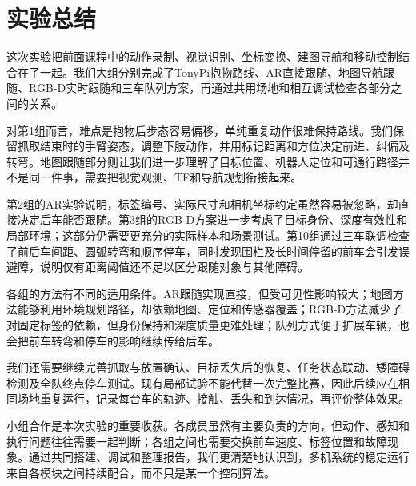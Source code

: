 \section{实验总结}
这次实验把前面课程中的动作录制、视觉识别、坐标变换、建图导航和移动控制结合在了一起。我们大组分别完成了TonyPi抱物路线、AR直接跟随、地图导航跟随、RGB-D实时跟随和三车队列方案，再通过共用场地和相互调试检查各部分之间的关系。

对第1组而言，难点是抱物后步态容易偏移，单纯重复动作很难保持路线。我们保留抓取结束时的手臂姿态，调整下肢动作，并用标记距离和方位决定前进、纠偏及转弯。地图跟随部分则让我们进一步理解了目标位置、机器人定位和可通行路径并不是同一件事，需要把视觉观测、TF和导航规划衔接起来。

第2组的AR实验说明，标签编号、实际尺寸和相机坐标约定虽然容易被忽略，却直接决定后车能否跟随。第3组的RGB-D方案进一步考虑了目标身份、深度有效性和局部环境；这部分仍需要更充分的实际样本和场景测试。第10组通过三车联调检查了前后车间距、圆弧转弯和顺序停车，同时发现围栏及长时间停留的前车会引发误避障，说明仅有距离阈值还不足以区分跟随对象与其他障碍。

各组的方法有不同的适用条件。AR跟随实现直接，但受可见性影响较大；地图方法能够利用环境规划路径，却依赖地图、定位和传感器覆盖；RGB-D方法减少了对固定标签的依赖，但身份保持和深度质量更难处理；队列方式便于扩展车辆，也会把前车转弯和停车的影响继续传给后车。

我们还需要继续完善抓取与放置确认、目标丢失后的恢复、任务状态联动、矮障碍检测及全队终点停车测试。现有局部试验不能代替一次完整比赛，因此后续应在相同场地重复运行，记录每台车的轨迹、接触、丢失和到达情况，再评价整体效果。

小组合作是本次实验的重要收获。各成员虽然有主要负责的方向，但动作、感知和执行问题往往需要一起判断；各组之间也需要交换前车速度、标签位置和故障现象。通过共同搭建、调试和整理报告，我们更清楚地认识到，多机系统的稳定运行来自各模块之间持续配合，而不只是某一个控制算法。
